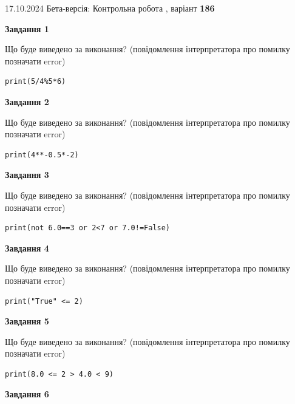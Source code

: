 \documentclass[12pt, ukrainian]{article}
\begin{document}
{\Large{17.10.2024 Бета-версія: Контрольна робота , варіант  \No \textbf { 186 }\par}}
{
\begin {large}
{\begin {center}\textbf{Завдання 1}\end {center}}

Що буде виведено за виконання? (повідомлення інтерпретатора про помилку позначати error)\par
\begin{verbatim}
print(5/4%5*6)
\end{verbatim}

{\begin {center}\textbf{Завдання 2}\end {center}}

Що буде виведено за виконання? (повідомлення інтерпретатора про помилку позначати error)\par
\begin{verbatim}
print(4**-0.5*-2)
\end{verbatim}

{\begin {center}\textbf{Завдання 3}\end {center}}

Що буде виведено за виконання? (повідомлення інтерпретатора про помилку позначати error)\par
\begin{verbatim}
print(not 6.0==3 or 2<7 or 7.0!=False)
\end{verbatim}

{\begin {center}\textbf{Завдання 4}\end {center}}

Що буде виведено за виконання? (повідомлення інтерпретатора про помилку позначати error)\par
\begin{verbatim}
print("True" <= 2)
\end{verbatim}

{\begin {center}\textbf{Завдання 5}\end {center}}

Що буде виведено за виконання? (повідомлення інтерпретатора про помилку позначати error)\par
\begin{verbatim}
print(8.0 <= 2 > 4.0 < 9)
\end{verbatim}

{\begin {center}\textbf{Завдання 6}\end {center}}


\end{large}}
\end{document}

